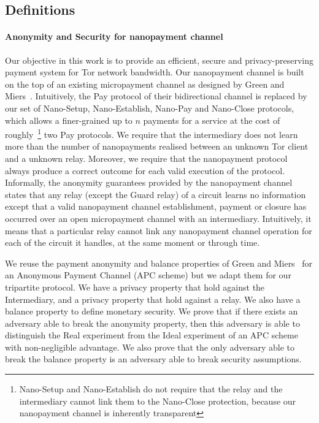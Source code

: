 
\subsection{Definitions}

\paragraph*{Anonymity and Security for nanopayment channel}
Our objective in this work is to provide an efficient, secure and privacy-preserving payment system for Tor network bandwidth. Our nanopayment channel is built on the top of an existing micropayment channel as designed by Green and Miers~\cite{green2017bolt}. Intuitively, the Pay protocol of their bidirectional channel is replaced by our set of Nano-Setup, Nano-Establish, Nano-Pay and Nano-Close protocols, which allows a finer-grained up to $n$ payments for a service at the cost of roughly~\footnote{Nano-Setup and Nano-Establish do not require that the relay and the intermediary cannot link them to the Nano-Close protection, because our nanopayment channel is inherently transparent} two Pay protocols.
We require that the intermediary does not learn more than the number of nanopayments realised between an unknown Tor client and a unknown relay. Moreover, we require that the nanopayment protocol always produce a correct outcome for each valid execution of the protocol.
Informally, the anonymity guarantees provided by the nanopayment channel states that any relay (except the Guard relay) of a circuit learns no information except that a valid nanopayment channel establishment, payment or closure has occurred over an open micropayment channel with an intermediary. Intuitively, it means that a particular relay cannot link any nanopayment channel operation for each of the circuit it handles, at the same moment or through time.

We reuse the payment anonymity and balance properties of Green and Miers~\cite{bolt-eprint} for an Anonymous Payment Channel (APC scheme) but we adapt them for our tripartite protocol. We have a privacy property that hold against the Intermediary, and a privacy property that hold against a relay. We also have a balance property to define monetary security.
We prove that if there exists an adversary able to break the anonymity property, then this adversary is able to distinguish the Real experiment from the Ideal experiment of an APC scheme with non-negligible advantage. We also prove that the only adversary able to break the balance property is an adversary able to break security assumptions.

